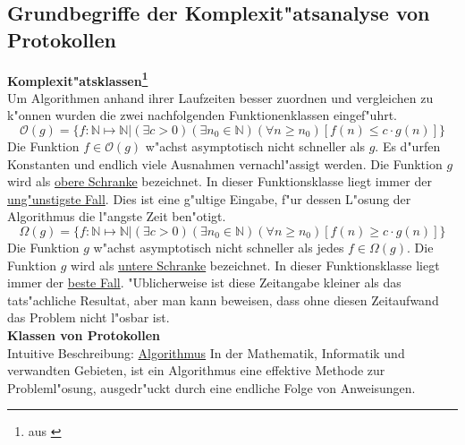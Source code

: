 \documentclass[11pt, a4paper, twoside]{article}
\numberwithin{equation}{section}
\begin{document}
\subsection{Grundbegriffe der Komplexit"atsanalyse von Protokollen}
\textbf{Komplexit"atsklassen\footnote{aus \cite{19}}}\\
\newline
Um Algorithmen anhand ihrer Laufzeiten besser zuordnen und vergleichen zu k"onnen wurden die zwei nachfolgenden Funktionenklassen eingef"uhrt.
$$\mathcal{O}(g)= \{f :\mathbb{N} \mapsto \mathbb{N} | (\exists c >0)(\exists n_0 \in \mathbb{N}) (\forall n \geq n_0) [f(n) \leq c \cdot g(n)]\}$$
 Die Funktion $f \in \mathcal{O}(g)$ w"achst asymptotisch nicht schneller als $g$. Es d"urfen Konstanten und endlich viele Ausnahmen vernachl"assigt werden. Die Funktion $g$ wird als \underline{obere Schranke} bezeichnet. In dieser Funktionsklasse liegt immer der \underline{ung"unstigste Fall}. Dies ist eine g"ultige Eingabe, f"ur dessen L"osung der Algorithmus die l"angste Zeit ben"otigt. \\
$$\Omega(g)= \{f :\mathbb{N} \mapsto \mathbb{N} | (\exists c >0)(\exists n_0 \in \mathbb{N}) (\forall n \geq n_0) [f(n) \geq c \cdot g(n)]\}$$
 Die Funktion $g$ w"achst asymptotisch nicht schneller als jedes $f \in \Omega(g)$. Die Funktion $g$ wird als \underline{untere Schranke} bezeichnet. In dieser Funktionsklasse liegt immer der \underline{beste Fall}. "Ublicherweise ist diese Zeitangabe kleiner als das tats"achliche Resultat, aber man kann beweisen, dass ohne diesen Zeitaufwand das Problem nicht l"osbar ist.\\
\newline
\textbf{Klassen von Protokollen}\\
\newline
Intuitive Beschreibung: \underline{Algorithmus}
\newline In der Mathematik, Informatik und verwandten Gebieten, ist ein Algorithmus eine effektive Methode zur Probleml"osung, ausgedr"uckt durch eine endliche Folge von Anweisungen.
\end{document}
